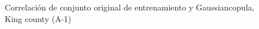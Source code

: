 \begin{figure}[H]
    \centering
    
    \caption{Correlación de conjunto original de entrenamiento y Gaussiancopula, King county (A-1)}
    \label{pairwise-king county-a-1-gaussiancopula}
\end{figure}